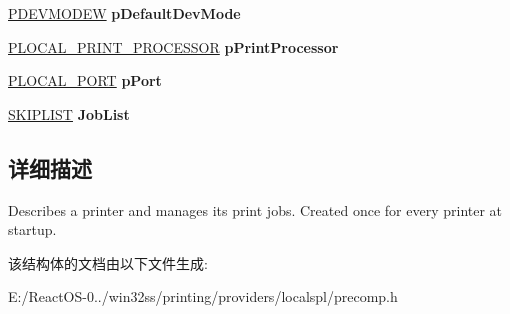 \begin{DoxyCompactItemize}
\mbox{\label{struct___l_o_c_a_l___p_r_i_n_t_e_r_accde5a8c9afdba3352e5c25b2dc483e7}} 
\hyperlink{struct__devicemode_w}{P\+D\+E\+V\+M\+O\+D\+EW} {\bfseries p\+Default\+Dev\+Mode}
\item 
\mbox{\label{struct___l_o_c_a_l___p_r_i_n_t_e_r_a7abd6e4adb3cd8fa7a7a5b96621fc1f0}} 
\hyperlink{struct___l_o_c_a_l___p_r_i_n_t___p_r_o_c_e_s_s_o_r}{P\+L\+O\+C\+A\+L\+\_\+\+P\+R\+I\+N\+T\+\_\+\+P\+R\+O\+C\+E\+S\+S\+OR} {\bfseries p\+Print\+Processor}
\item 
\mbox{\label{struct___l_o_c_a_l___p_r_i_n_t_e_r_a21a7ec76d01ba3af675ed3368c30b3af}} 
\hyperlink{struct___l_o_c_a_l___p_o_r_t}{P\+L\+O\+C\+A\+L\+\_\+\+P\+O\+RT} {\bfseries p\+Port}
\item 
\mbox{\label{struct___l_o_c_a_l___p_r_i_n_t_e_r_ad6e5a655e493d4d8eb38efde23b2a43c}} 
\hyperlink{struct___s_k_i_p_l_i_s_t}{S\+K\+I\+P\+L\+I\+ST} {\bfseries Job\+List}
\end{DoxyCompactItemize}


\subsection{详细描述}
Describes a printer and manages its print jobs. Created once for every printer at startup. 

该结构体的文档由以下文件生成\+:\begin{DoxyCompactItemize}
\item 
E\+:/\+React\+O\+S-\/0../win32ss/printing/providers/localspl/precomp.\+h\end{DoxyCompactItemize}
